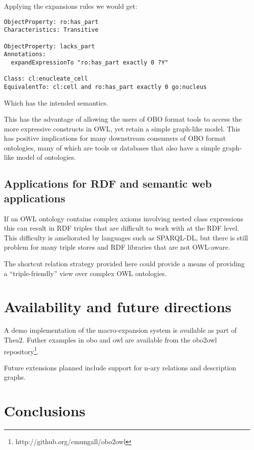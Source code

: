 \documentclass{llncs}
\begin{document}
Applying the expansions rules we would get:

\begin{verbatim}
ObjectProperty: ro:has_part
Characteristics: Transitive

ObjectProperty: lacks_part
Annotations:
  expandExpressionTo "ro:has_part exactly 0 ?Y"

Class: cl:enucleate_cell
EquivalentTo: cl:cell and ro:has_part exactly 0 go:nucleus
\end{verbatim}

Which has the intended semantics.

This has the advantage of allowing the users of OBO format tools to
access the more expressive constructs in OWL, yet retain a simple
graph-like model. This has positive implications for many downstream
consumers of OBO format ontologies, many of which are tools or
databases that also have a simple graph-like model of ontologies.

\subsection{Applications for RDF and semantic web applications}

If an OWL ontology contains complex axioms involving nested class
expressions this can result in RDF triples that are difficult to work
with at the RDF level. This difficulty is ameliorated by languages
such as SPARQL-DL, but there is still problem for many triple stores
and RDF libraries that are not OWL-aware.

The shortcut relation strategy provided here could provide a means of
providing a ``triple-friendly'' view over complex OWL ontologies.

\section{Availability and future directions}

A demo implementation of the macro-expansion system is available as
part of Thea2\cite{Vangelis_2009}. Futher examples in obo and owl are
available from the obo2owl
repository\footnote{http://github.org/cmungall/obo2owl}.

Future extensions planned include support for n-ary relations and
description graphs.

\section{Conclusions}
\end{document}

